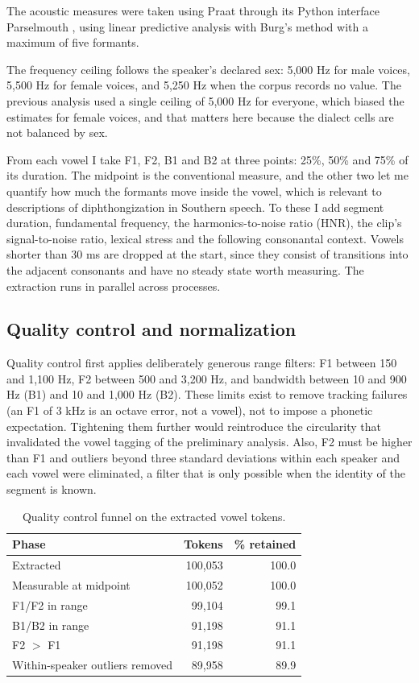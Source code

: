 \documentclass[11pt]{article}
\begin{document}
The acoustic measures were taken using Praat \citep{boersma2021} through its
Python interface Parselmouth \citep{jadoul2018}, using linear predictive analysis
with Burg's method with a maximum of five formants.

The frequency ceiling follows the speaker's declared sex: 5,000 Hz for male
voices, 5,500 Hz for female voices, and 5,250 Hz when the corpus records no
value. The previous analysis used a single ceiling of 5,000 Hz for everyone,
which biased the estimates for female voices, and that matters here because the
dialect cells are not balanced by sex.

From each vowel I take F1, F2, B1 and B2 at three points: 25\%, 50\% and 75\% of
its duration. The midpoint is the conventional measure, and the other two let me
quantify how much the formants move inside the vowel, which is relevant to
descriptions of diphthongization in Southern speech. To these I add segment
duration, fundamental frequency, the harmonics-to-noise ratio (HNR), the clip's
signal-to-noise ratio, lexical stress and the following consonantal context.
Vowels shorter than 30 ms are dropped at the start, since they consist of
transitions into the adjacent consonants and have no steady state worth
measuring. The extraction runs in parallel across processes.

\subsection{Quality control and normalization}
\label{sec:qc}

Quality control first applies deliberately generous range filters: F1 between 150
and 1,100 Hz, F2 between 500 and 3,200 Hz, and bandwidth between 10 and 900 Hz
(B1) and 10 and 1,000 Hz (B2). These limits exist to remove tracking failures (an
F1 of 3 kHz is an octave error, not a vowel), not to impose a phonetic
expectation. Tightening them further would reintroduce the circularity that
invalidated the vowel tagging of the preliminary analysis. Also, F2 must be
higher than F1 and outliers beyond three standard deviations within each speaker
and each vowel were eliminated, a filter that is only possible when the identity
of the segment is known.

\begin{table}[t]
\centering
\small
\begin{tabular}{lrr}
\toprule
Phase & Tokens & \% retained \\
\midrule
Extracted                        & 100,053 & 100.0 \\
Measurable at midpoint           & 100,052 & 100.0 \\
F1/F2 in range                   &  99,104 &  99.1 \\
B1/B2 in range                   &  91,198 &  91.1 \\
F2 $>$ F1                        &  91,198 &  91.1 \\
Within-speaker outliers removed  &  89,958 &  89.9 \\
\bottomrule
\end{tabular}
\caption{Quality control funnel on the extracted vowel tokens.}
\label{tab:qc}
\end{table}
\end{document}

